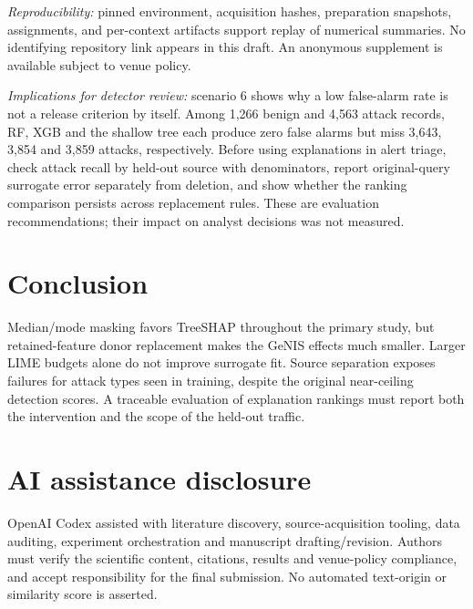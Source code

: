 \documentclass[conference,letterpaper]{IEEEtran}
\begin{document}
\textit{Reproducibility:} pinned environment, acquisition hashes, preparation snapshots, assignments, and per-context artifacts support replay of numerical summaries. No identifying repository link appears in this draft. An anonymous supplement is available subject to venue policy.

\textit{Implications for detector review:} scenario 6 shows why a low false-alarm rate is not a release criterion by itself. Among 1,266 benign and 4,563 attack records, RF, XGB and the shallow tree each produce zero false alarms but miss 3,643, 3,854 and 3,859 attacks, respectively. Before using explanations in alert triage, check attack recall by held-out source with denominators, report original-query surrogate error separately from deletion, and show whether the ranking comparison persists across replacement rules. These are evaluation recommendations; their impact on analyst decisions was not measured.

\section{Conclusion}
Median/mode masking favors TreeSHAP throughout the primary study, but retained-feature donor replacement makes the GeNIS effects much smaller. Larger LIME budgets alone do not improve surrogate fit. Source separation exposes failures for attack types seen in training, despite the original near-ceiling detection scores. A traceable evaluation of explanation rankings must report both the intervention and the scope of the held-out traffic.

\section*{AI assistance disclosure}
OpenAI Codex assisted with literature discovery, source-acquisition tooling, data auditing, experiment orchestration and manuscript drafting/revision. Authors must verify the scientific content, citations, results and venue-policy compliance, and accept responsibility for the final submission. No automated text-origin or similarity score is asserted.
\end{document}
